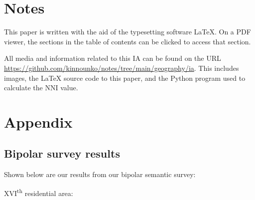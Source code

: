 \documentclass[11pt,letterpaper]{article}
\begin{document}
\newpage
{}


\section*{Notes}
\label{sec:notes}

This paper is written with the aid of the typesetting software \LaTeX. On a PDF viewer, the sections in the table of contents can be clicked to access that section.

All media and information related to this IA can be found on the URL \url{https://github.com/kinnounko/notes/tree/main/geography/ia}. This includes images, the \LaTeX{} source code to this paper, and the Python program used to calculate the NNI value.

\printbibliography

\appendix
\section{Appendix}
\label{app}

\subsection{Bipolar survey results}
\label{app:bipolar}

Shown below are our results from our bipolar semantic survey:

XVI\textsuperscript{th} residential area:
\end{document}
